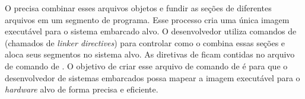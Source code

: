 




O \linker precisa combinar esses arquivos objetos e fundir as seções de diferentes arquivos em um segmento de programa. Esse processo cria uma única imagem executável para o sistema embarcado alvo. O desenvolvedor utiliza comandos de \linker (chamados de \textit{linker directives}) para controlar como o \linker combina essas seções e aloca seus segmentos no sistema alvo. As diretivas de \linker ficam contidas no arquivo de comando de \linker. O objetivo de criar esse arquivo de comando de \linker é para que o desenvolvedor de sistemas embarcados possa mapear a imagem executável para o \textit{hardware} alvo de forma precisa e eficiente. 

